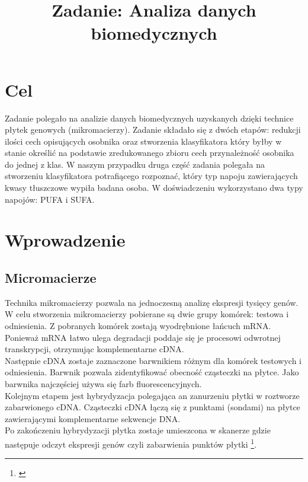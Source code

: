\documentclass{classrep}
\author{
  \studentinfo{Leszek Wach}{169513} \and
  \studentinfo{Michał Janiszewski}{169485} \and
}
\title{Zadanie: Analiza danych biomedycznych}
\begin{document}
\maketitle

\section{Cel}
Zadanie polegało na analizie danych biomedycznych uzyskanych dzięki technice płytek genowych (mikromacierzy). Zadanie składało się z dwóch etapów: redukcji ilości cech opisujących osobnika oraz stworzenia klasyfikatora który byłby w stanie określić na podstawie zredukowanego zbioru cech przynależność osobnika do jednej z klas. W naszym przypadku druga część zadania polegała na stworzeniu klasyfikatora potrafiącego rozpoznać, który typ napoju zawierających kwasy tłuszczowe wypiła badana osoba. W doświadczeniu wykorzystano dwa typy napojów: PUFA i SUFA.

\section{Wprowadzenie}
\subsection{Micromacierze}
Technika mikromacierzy pozwala na jednoczesną analizę ekspresji tysięcy genów. W celu stworzenia mikromacierzy pobierane są dwie grupy komórek: testowa i odniesienia.
Z pobranych komórek zostają wyodrębnione łańcuch mRNA. Ponieważ mRNA łatwo ulega degradacji poddaje się je procesowi odwrotnej transkrypcji, otrzymując komplementarne cDNA.\\ \indent Następnie cDNA zostaje zaznaczone barwnikiem różnym dla komórek testowych i odniesienia. Barwnik pozwala zidentyfikować obecność cząsteczki na płytce. Jako barwnika najczęściej używa się farb fluorescencyjnych.\\
\indent Kolejnym etapem jest hybrydyzacja polegająca an zanurzeniu płytki w roztworze zabarwionego cDNA. Cząsteczki cDNA łączą się z punktami (sondami) na płytce zawierającymi komplementarne sekwencje DNA.\\
\indent Po zakończeniu hybrydyzacji płytka zostaje umieszcona w skanerze gdzie następuje odczyt ekspresji genów czyli zabarwienia punktów płytki \footnote{\cite{metodyklasyfikacji}}.
\end{document}
